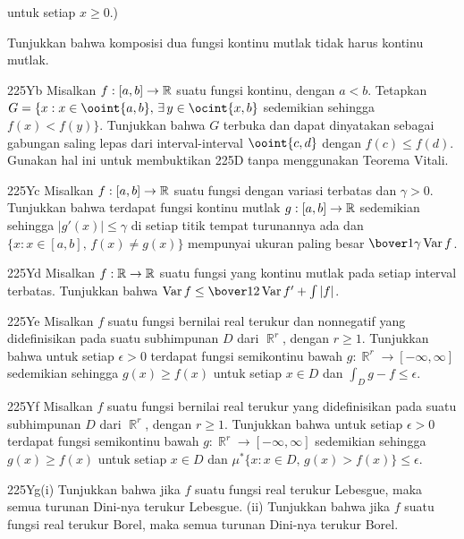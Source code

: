 {

\noindent untuk setiap $x\ge 0$.)

Tunjukkan bahwa komposisi dua fungsi kontinu
mutlak tidak harus kontinu mutlak.   

\spheader 225Yb Misalkan $f:[a,b]\to\Bbb R$ suatu fungsi kontinu, dengan
$a<b$.   Tetapkan $G=\{x:x\in\ooint{a,b},\,\exists\,y\in\ocint{x,b}$ sedemikian
sehingga $f(x)<f(y)\}$.   Tunjukkan bahwa $G$ terbuka dan dapat dinyatakan sebagai
gabungan saling lepas dari interval-interval $\ooint{c,d}$ dengan $f(c)\le f(d)$.   Gunakan
hal ini untuk membuktikan 225D tanpa menggunakan Teorema Vitali.

\spheader 225Yc Misalkan $f:[a,b]\to\Bbb R$ suatu fungsi dengan variasi
terbatas dan $\gamma>0$.   Tunjukkan bahwa terdapat fungsi kontinu mutlak
$g:[a,b]\to\Bbb R$ sedemikian sehingga $|g'(x)|\le\gamma$ di setiap titik tempat
turunannya ada dan $\{x:x\in[a,b],\,f(x)\ne g(x)\}$ mempunyai ukuran
paling besar $\bover1{\gamma}\Var f$.   

\spheader 225Yd
Misalkan $f:\Bbb R\to\Bbb R$ suatu fungsi yang kontinu
mutlak pada setiap interval terbatas.   Tunjukkan bahwa
$\Var f\le\bover12\Var f'+\int|f|$.

\spheader 225Ye Misalkan $f$ suatu fungsi bernilai real terukur dan
nonnegatif yang didefinisikan pada suatu subhimpunan $D$ dari $\BbbR^r$, dengan $r\ge 1$.   Tunjukkan
bahwa untuk setiap $\epsilon>0$ terdapat fungsi semikontinu bawah
$g:\BbbR^r\to[-\infty,\infty]$ sedemikian sehingga $g(x)\ge f(x)$ untuk
setiap $x\in D$ dan $\int_Dg-f\le\epsilon$.

\spheader 225Yf Misalkan $f$ suatu fungsi bernilai real terukur
yang didefinisikan pada suatu subhimpunan $D$ dari $\BbbR^r$, dengan $r\ge 1$.   Tunjukkan bahwa untuk
setiap $\epsilon>0$ terdapat fungsi semikontinu bawah
$g:\BbbR^r\to[-\infty,\infty]$ sedemikian sehingga $g(x)\ge f(x)$ untuk setiap
$x\in D$ dan
$\mu^*\{x:x\in D,\,g(x)>f(x)\}\le\epsilon$.   

\spheader 225Yg(i) Tunjukkan bahwa jika $f$ suatu fungsi real terukur Lebesgue,
maka semua turunan Dini-nya terukur Lebesgue.
(ii) Tunjukkan bahwa jika $f$ suatu fungsi real terukur Borel,
maka semua turunan Dini-nya terukur Borel.
}%


